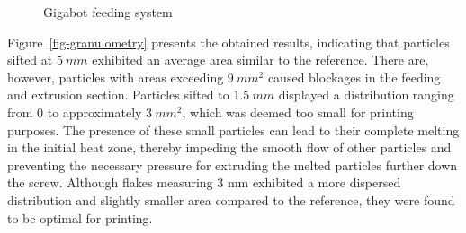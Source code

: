 \documentclass[
]{article}
\begin{document}
\begin{figure}
\begin{minipage}[t]{0.40\linewidth}
{\centering 


\caption{\label{fig-crammer}Gigabot feeding system}

}

\end{minipage}%

\end{figure}

Figure~\ref{fig-granulometry} presents the obtained results, indicating
that particles sifted at \(5~mm\) exhibited an average area similar to
the reference. There are, however, particles with areas exceeding
\(9~mm^{2}\) caused blockages in the feeding and extrusion section.
Particles sifted to \(1.5~mm\) displayed a distribution ranging from 0
to approximately \(3~mm^{2}\), which was deemed too small for printing
purposes. The presence of these small particles can lead to their
complete melting in the initial heat zone, thereby impeding the smooth
flow of other particles and preventing the necessary pressure for
extruding the melted particles further down the screw. Although flakes
measuring 3 mm exhibited a more dispersed distribution and slightly
smaller area compared to the reference, they were found to be optimal
for printing.
\end{document}
